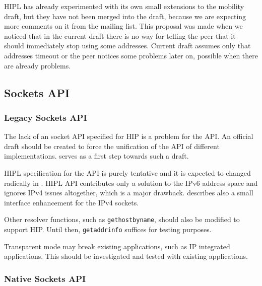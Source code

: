 HIPL has already experimented with its own small extensions to the
mobility draft, but they have not been merged into the draft, because
we are expecting more comments on it from the mailing list. This
proposal was made when we noticed that in the current draft there is
no way for telling the peer that it should immediately stop using some
addresses. Current draft assumes only that addresses timeout or the
peer notices some problems later on, possible when there are already
problems.

\subsection{Sockets API}

\subsubsection{Legacy Sockets API}

The lack of an socket \ac{API} specified for \ac{HIP} is a problem for
the \ac{API}. An official draft should be created to force the
unification of the \ac{API} of different
implementations. \cite{hipapi} serves as a first step towards such a
draft.

\ac{HIPL} specification for the \ac{API}
 is purely tentative and it is expected
to changed radically in \cite{hipapi}. \ac{HIPL} \ac{API} contributes
only a solution to the IPv6 address space and ignores IPv4 issues
altogether, which is a major drawback. \cite{boeing} describes also a
small interface enhancement for the IPv4 sockets.

Other resolver functions, such as \verb|gethostbyname|, should also be
modified to support \ac{HIP}. Until then, \verb|getaddrinfo| suffices
for testing purposes.


Transparent mode may break existing applications, such as IP
integrated applications. This should be investigated and tested with
existing applications.

\subsubsection{Native Sockets API}

